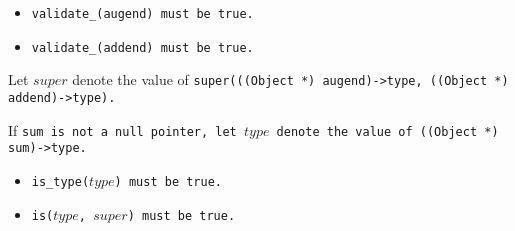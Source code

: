 \begin{itemize}

\item \tt{validate_(augend)} must be \tt{true}.

\item \tt{validate_(addend)} must be \tt{true}.

\end{itemize}

Let $super$ denote the value of
\tt{super(((Object *) augend)->type, ((Object *) addend)->type)}.

If \tt{sum} is not a null pointer, let $type$
denote the value of \tt{((Object *) sum)->type}.

\begin{itemize}

\item \tt{is_type(}$type$\tt{)} must be \tt{true}.

\item \tt{is(}$type$\tt{,} $super$\tt{)} must be \tt{true}.

\end{itemize}
